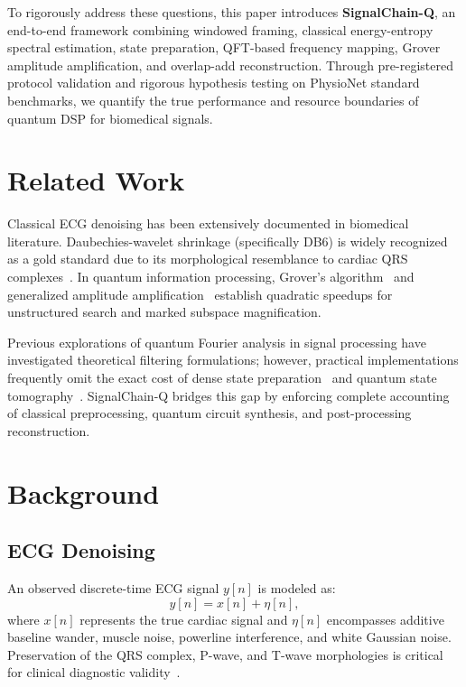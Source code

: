 \documentclass[journal,compsoc]{IEEEtran}
\begin{document}
To rigorously address these questions, this paper introduces \textbf{SignalChain-Q}, an end-to-end framework combining windowed framing, classical energy-entropy spectral estimation, state preparation, QFT-based frequency mapping, Grover amplitude amplification, and overlap-add reconstruction. Through pre-registered protocol validation and rigorous hypothesis testing on PhysioNet standard benchmarks, we quantify the true performance and resource boundaries of quantum DSP for biomedical signals.

\section{Related Work}
Classical ECG denoising has been extensively documented in biomedical literature. Daubechies-wavelet shrinkage (specifically DB6) is widely recognized as a gold standard due to its morphological resemblance to cardiac QRS complexes~\cite{daubechies1992ten}. In quantum information processing, Grover's algorithm~\cite{grover1996} and generalized amplitude amplification~\cite{brassard2002quantum,boyer1998tight} establish quadratic speedups for unstructured search and marked subspace magnification. 

Previous explorations of quantum Fourier analysis in signal processing have investigated theoretical filtering formulations; however, practical implementations frequently omit the exact cost of dense state preparation~\cite{mottonen2004transformation} and quantum state tomography~\cite{aaronson2015read}. SignalChain-Q bridges this gap by enforcing complete accounting of classical preprocessing, quantum circuit synthesis, and post-processing reconstruction.

\section{Background}
\subsection{ECG Denoising}
An observed discrete-time ECG signal $y[n]$ is modeled as:
\begin{equation}
y[n] = x[n] + \eta[n],
\end{equation}
where $x[n]$ represents the true cardiac signal and $\eta[n]$ encompasses additive baseline wander, muscle noise, powerline interference, and white Gaussian noise. Preservation of the QRS complex, P-wave, and T-wave morphologies is critical for clinical diagnostic validity~\cite{pantompkins1985}.
\end{document}
